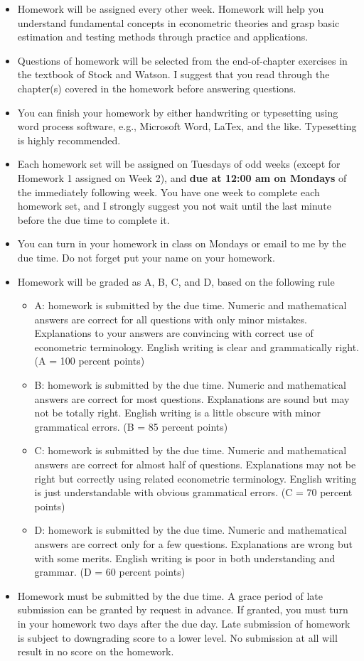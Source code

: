 \documentclass[a4paper,11pt]{article}
\begin{document}
\begin{itemize}
\item Homework will be assigned every other week. Homework will help
you understand fundamental concepts in econometric theories and
grasp basic estimation and testing methods through practice and
applications.
\item Questions of homework will be selected from the end-of-chapter
exercises in the textbook of Stock and Watson. I suggest that you
read through the chapter(s) covered in the homework before answering
questions.
\item You can finish your homework by either handwriting or typesetting
using word process software, e.g., Microsoft Word, LaTex, and the
like. Typesetting is highly recommended.
\item Each homework set will be assigned on Tuesdays of odd weeks (except
for Homework 1 assigned on Week 2), and
\textbf{due at 12:00 am on Mondays} of the immediately following
week. You have one week to complete each homework set, and I
strongly suggest you not wait until the last minute before the due
time to complete it.
\item You can turn in your homework in class on Mondays or email to me
by the due time. Do not forget put your name on your homework.
\item Homework will be graded as A, B, C, and D, based on the following
rule
\begin{itemize}
\item A: homework is submitted by the due time. Numeric and mathematical
answers are correct for all questions with only minor
mistakes. Explanations to your answers are convincing with correct
use of econometric terminology. English writing is clear and
grammatically right. (A = 100 percent points)
\item B: homework is submitted by the due time. Numeric and mathematical
answers are correct for most questions. Explanations are sound but
may not be totally right. English writing is a little obscure with
minor grammatical errors. (B = 85 percent points)
\item C: homework is submitted by the due time. Numeric and mathematical
answers are correct for almost half of questions. Explanations may
not be right but correctly using related econometric
terminology. English writing is just understandable with obvious
grammatical errors. (C = 70 percent points)
\item D: homework is submitted by the due time. Numeric and mathematical
answers are correct only for a few questions. Explanations are
wrong but with some merits. English writing is poor in both
understanding and grammar. (D = 60 percent points)
\end{itemize}
\item Homework must be submitted by the due time. A grace period of late
submission can be granted by request in advance. If granted, you
must turn in your homework two days after the due day. Late
submission of homework is subject to downgrading score to a lower
level. No submission at all will result in no score on the homework.
\end{itemize}
\end{document}
